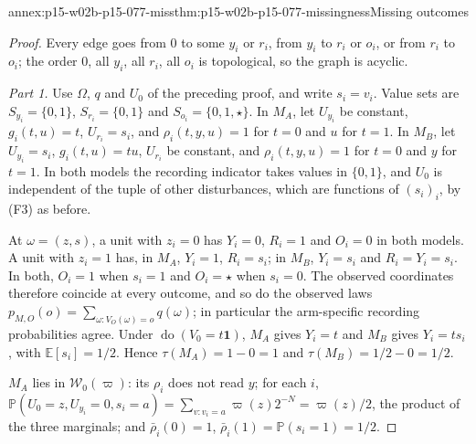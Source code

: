 \begin{annexitem}{annex:p15-w02b-p15-077-miss}{thm:p15-w02b-p15-077-missingness}{Missing outcomes}
\begin{proof}
Every edge goes from \(0\) to some \(y_i\) or \(r_i\), from \(y_i\)
to \(r_i\) or \(o_i\), or from \(r_i\) to \(o_i\); the order \(0\),
all \(y_i\), all \(r_i\), all \(o_i\) is topological, so the graph is
acyclic.

\emph{Part 1.} Use \(\Omega\), \(q\) and \(U_0\) of the preceding proof,
and write \(s_i=v_i\). Value sets are \(S_{y_i}=\{0,1\}\),
\(S_{r_i}=\{0,1\}\) and \(S_{o_i}=\{0,1,\star\}\).
In \(M_A\), let \(U_{y_i}\) be constant, \(g_i(t,u)=t\),
\(U_{r_i}=s_i\), and \(\rho_i(t,y,u)=1\) for \(t=0\) and \(u\) for
\(t=1\). In \(M_B\), let \(U_{y_i}=s_i\), \(g_i(t,u)=tu\),
\(U_{r_i}\) be constant, and \(\rho_i(t,y,u)=1\) for \(t=0\) and \(y\)
for \(t=1\). In both models the recording indicator takes values in
\(\{0,1\}\), and \(U_0\) is independent of the tuple of other
disturbances, which are functions of \((s_i)_i\), by (F3) as before.

At \(\omega=(z,s)\), a unit with \(z_i=0\) has \(Y_i=0\), \(R_i=1\) and
\(O_i=0\) in both models. A unit with \(z_i=1\) has, in \(M_A\),
\(Y_i=1\), \(R_i=s_i\); in \(M_B\), \(Y_i=s_i\) and
\(R_i=Y_i=s_i\). In both, \(O_i=1\) when \(s_i=1\) and \(O_i=\star\)
when \(s_i=0\). The observed coordinates therefore coincide at every
outcome, and so do the observed laws
\(p_{M,O}(o)=\sum_{\omega:V_O(\omega)=o}q(\omega)\); in particular the
arm-specific recording probabilities agree. Under
\(\operatorname{do}(V_0=t\mathbf 1)\), \(M_A\) gives \(Y_i=t\) and
\(M_B\) gives \(Y_i=ts_i\), with \(\mathbb E[s_i]=1/2\). Hence
\(\tau(M_A)=1-0=1\) and \(\tau(M_B)=1/2-0=1/2\).

\(M_A\) lies in \(\mathcal W_0(\varpi)\): its \(\rho_i\) does not read
\(y\); for each \(i\),
\(\mathbb P(U_0=z,U_{y_i}=0,s_i=a)=\sum_{v:v_i=a}\varpi(z)2^{-N}
=\varpi(z)/2\), the product of the three marginals; and
\(\bar\rho_i(0)=1\), \(\bar\rho_i(1)=\mathbb P(s_i=1)=1/2\).


\end{proof}
\end{annexitem}
